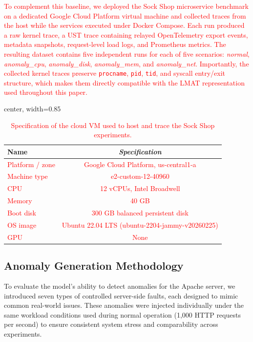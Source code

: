 \documentclass[preprint,12pt]{elsarticle}
\begin{document}
\textcolor{red}{To complement this baseline, we deployed the Sock Shop microservice benchmark on a dedicated Google Cloud Platform virtual machine and collected traces from the host while the services executed under Docker Compose. Each run produced a raw kernel trace, a UST trace containing relayed OpenTelemetry export events, metadata snapshots, request-level load logs, and Prometheus metrics. The resulting dataset contains five independent runs for each of five scenarios: \textit{normal}, \textit{anomaly\_cpu}, \textit{anomaly\_disk}, \textit{anomaly\_mem}, and \textit{anomaly\_net}. Importantly, the collected kernel traces preserve \texttt{procname}, \texttt{pid}, \texttt{tid}, and syscall entry/exit structure, which makes them directly compatible with the LMAT representation used throughout this paper.}

\begin{table}[tb]
\caption{\textcolor{red}{Specification of the cloud VM used to host and trace the Sock Shop experiments.}}
\centering
\begin{adjustbox}{center, width=0.85\textwidth}
\begin{tabular}{lc}
\hline \hline
Name & \textit{Specification} \\\hline
\textcolor{red}{Platform / zone} & \textcolor{red}{Google Cloud Platform, us-central1-a} \\
\textcolor{red}{Machine type} & \textcolor{red}{e2-custom-12-40960} \\
\textcolor{red}{CPU} & \textcolor{red}{12 vCPUs, Intel Broadwell} \\
\textcolor{red}{Memory} & \textcolor{red}{40 GB} \\
\textcolor{red}{Boot disk} & \textcolor{red}{300 GB balanced persistent disk} \\
\textcolor{red}{OS image} & \textcolor{red}{Ubuntu 22.04 LTS (ubuntu-2204-jammy-v20260225)} \\
\textcolor{red}{GPU} & \textcolor{red}{None} \\
\hline \hline
\end{tabular}
\end{adjustbox}
\label{tbl:systemconfiguration_sockshop}
\end{table}


\subsection{Anomaly Generation Methodology}

To evaluate the model’s ability to detect anomalies for the Apache server, we introduced seven types of controlled server-side faults, each designed to mimic common real-world issues. These anomalies were injected individually under the same workload conditions used during normal operation (1,000 HTTP requests per second) to ensure consistent system stress and comparability across experiments.
\end{document}

